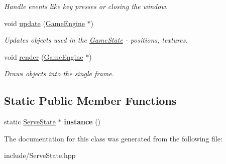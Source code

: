\begin{DoxyCompactItemize}
\begin{DoxyCompactList}\small\item\em Handle events like key presses or closing the window. \end{DoxyCompactList}\item 
\mbox{\label{class_serve_state_ac227c95e6d1ed3f3d1fc01c4035db847}} 
void \mbox{\hyperlink{class_serve_state_ac227c95e6d1ed3f3d1fc01c4035db847}{update}} (\mbox{\hyperlink{class_game_engine}{Game\+Engine}} $\ast$)
\begin{DoxyCompactList}\small\item\em Updates objects used in the \mbox{\hyperlink{class_game_state}{Game\+State}} -\/ positions, textures. \end{DoxyCompactList}\item 
\mbox{\label{class_serve_state_a91cd889069e5b9f073ac33addeed2913}} 
void \mbox{\hyperlink{class_serve_state_a91cd889069e5b9f073ac33addeed2913}{render}} (\mbox{\hyperlink{class_game_engine}{Game\+Engine}} $\ast$)
\begin{DoxyCompactList}\small\item\em Draws objects into the single frame. \end{DoxyCompactList}\end{DoxyCompactItemize}
\subsection*{Static Public Member Functions}
\begin{DoxyCompactItemize}
\item 
\mbox{\label{class_serve_state_ac0f3ead67813e13e2a84026162da3b7c}} 
static \mbox{\hyperlink{class_serve_state}{Serve\+State}} $\ast$ {\bfseries instance} ()
\end{DoxyCompactItemize}


The documentation for this class was generated from the following file\+:\begin{DoxyCompactItemize}
\item 
include/Serve\+State.\+hpp\end{DoxyCompactItemize}
